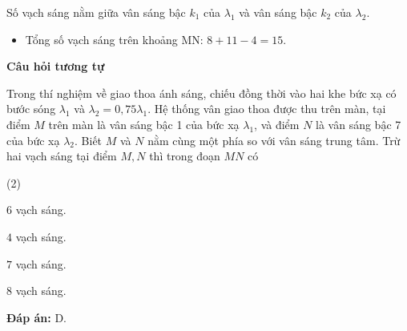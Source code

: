 \begin{dang}{Số vạch sáng nằm giữa vân sáng bậc $k_1$ của $\lambda_1$ và vân sáng bậc $k_2$ của $\lambda_2$.}
{\begin{itemize}
			\item Tổng số vạch sáng trên khoảng MN: $8+11-4=15$.  
		\end{itemize}
		
		\begin{center}
			\textbf{Câu hỏi tương tự}
		\end{center}
		
		Trong thí nghiệm về giao thoa ánh sáng, chiếu đồng thời vào hai khe bức xạ có bước sóng $ \lambda_{1} $ và $ \lambda_{2} = 0,75 \lambda_{1} $. Hệ thống vân giao thoa được thu trên màn, tại điểm $ M $ trên màn là vân sáng bậc 1 của bức xạ $ \lambda_{1} $, và điểm $ N $ là vân sáng bậc 7 của bức xạ $ \lambda_{2} $. Biết $ M $ và $ N $ nằm cùng một phía so với vân sáng trung tâm. Trừ hai vạch sáng tại điểm $ M, N $ thì trong đoạn $ MN $ có
		\begin{mcq}(2)
			\item $ 6 $ vạch sáng.
			\item $ 4 $ vạch sáng.
			\item $ 7 $ vạch sáng.
			\item $ 8 $ vạch sáng.
		\end{mcq}
		
		\textbf{Đáp án:} D.
	}
\end{dang}


